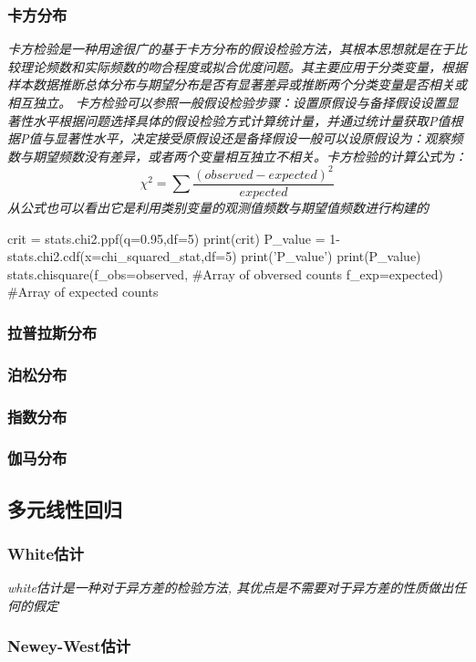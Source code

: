 \documentclass{scrartcl}
\numberwithin{equation}{section}   %
\begin{document}
\subsubsection{卡方分布}
\textsl{卡方检验是一种用途很广的基于卡方分布的假设检验方法，其根本思想就是在于比较理论频数和实际频数的吻合程度或拟合优度问题。其主要应用于分类变量，根据样本数据推断总体分布与期望分布是否有显著差异或推断两个分类变量是否相关或相互独立。}
\textsl{
    卡方检验可以参照一般假设检验步骤：设置原假设与备择假设设置显著性水平根据问题选择具体的假设检验方式计算统计量，并通过统计量获取P值根据P值与显著性水平，决定接受原假设还是备择假设一般可以设原假设为：观察频数与期望频数没有差异，或者两个变量相互独立不相关。卡方检验的计算公式为： $$\chi^2 = \sum \frac{(observed - expected)^2}{expected}$$从公式也可以看出它是利用类别变量的观测值频数与期望值频数进行构建的
}

\begin{python}
crit = stats.chi2.ppf(q=0.95,df=5)
print(crit)
P_value = 1-stats.chi2.cdf(x=chi_squared_stat,df=5)
print('P_value')
print(P_value) 
stats.chisquare(f_obs=observed, #Array of obversed counts
                f_exp=expected) #Array of expected counts
\end{python}

\subsubsection{拉普拉斯分布}
\subsubsection{泊松分布}
\subsubsection{指数分布}
\subsubsection{伽马分布}
\subsection{多元线性回归}

\subsubsection{White估计}
\textsl{white估计是一种对于异方差的检验方法, 其优点是不需要对于异方差的性质做出任何的假定}
\subsubsection{Newey-West估计}
\end{document}
